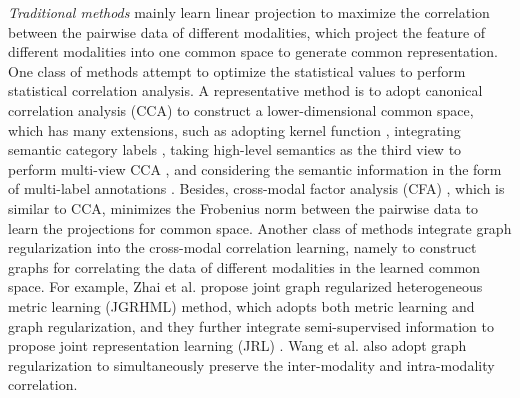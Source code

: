 \documentclass[journal]{IEEEtran}
\begin{document}
\textit{Traditional methods} mainly learn linear projection to maximize the correlation between the pairwise data of different modalities, which project the feature of different modalities into one common space to generate common representation. One class of methods attempt to optimize the statistical values to perform statistical correlation analysis. A representative method is to adopt canonical correlation analysis (CCA) \cite{HotelingBiometrika36RelationBetweenTwoVariates} to construct a lower-dimensional common space, which has many extensions, such as adopting kernel function \cite{DBLP:journals/neco/HardoonSS04}, integrating semantic category labels \cite{RasiwasiaMM10SemanticCCA}, taking high-level semantics as the third view to perform multi-view CCA \cite{DBLP:journals/ijcv/GongKIL14}, and considering the semantic information in the form of multi-label annotations \cite{DBLP:conf/iccv/RanjanRJ15}. Besides, cross-modal factor analysis (CFA) \cite{LiMM03CFA}, which is similar to CCA, minimizes the Frobenius norm between the pairwise data to learn the projections for common space. Another class of methods integrate graph regularization into the cross-modal correlation learning, namely to construct graphs for correlating the data of different modalities in the learned common space. For example, Zhai et al. \cite{ZhaiAAAI2013JGRHML} propose joint graph regularized heterogeneous metric learning (JGRHML) method, which adopts both metric learning and graph regularization, and they further integrate semi-supervised information to propose joint representation learning (JRL) \cite{ZhaiTCSVT2014JRL}. Wang et al. \cite{DBLP:journals/pami/WangHWWT16} also adopt graph regularization to simultaneously preserve the inter-modality and intra-modality correlation.
\end{document}
